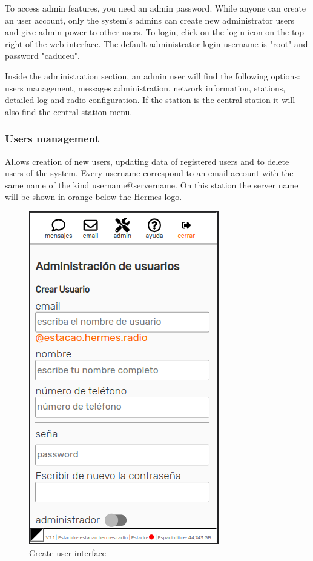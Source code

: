 \documentclass[11pt,a4paper]{article}
\begin{document}
To access admin features, you need an admin password. While anyone can create an user account, only the system's admins can create new administrator users and give admin power to other users. To login, click on the login icon on the top right of the web interface. The default administrator login username is "root" and password "caduceu".

Inside the administration section, an admin user will find the following options: users management, messages administration, network information, stations, detailed log and radio configuration. If the station is the central station it will also find the central station menu.

\subsubsection{Users management} 

Allows creation of new users, updating data of registered users and to delete users of the system. Every username correspond to an email account with the same name of the kind username@servername. On this station the server name will be shown in orange below the Hermes logo.
    
    \begin{figure}[H]
    \centering
    \includegraphics[width=0.5\columnwidth]{screenshots/frontend/es/createuser.png}
    \caption{Create user interface}
    \label{fig:createuser}
    \end{figure}
    
\end{document}
